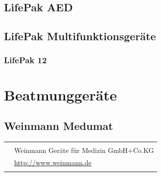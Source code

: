 % 


\TakeNotesLarge



\subsection{LifePak{\protect\texttrademark} AED}

\TakeNotesLarge

\subsection{LifePak{\protect\texttrademark} Multifunktionsgeräte}

\subsubsection{LifePak{\protect\texttrademark} 12}

\TakeNotesLarge{}


\section{Beatmunggeräte}

\subsection{Weinmann Medumat{\protect\texttrademark}}

\begin{table}[H]
\begin{tabulary}{\linewidth}{LL}
&
\\\addlinespace\midrule\addlinespace
{}
&
Weinmann Geräte für Medizin GmbH+Co.KG
\\\addlinespace
{}
&
\url{http://www.weinmann.de}
\\\addlinespace\bottomrule
\end{tabulary}
\end{table}

